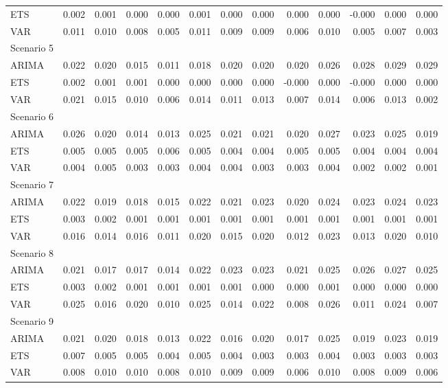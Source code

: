 \begin{table}[!htb]
{\begin{tabular}{lrrrrrrrrrrrr}
      ETS & 0.002 & 0.001 & 0.000 & 0.000 & 0.001 & 0.000 & 0.000 & 0.000 & 0.000 & -0.000 & 0.000 & 0.000 \\
      VAR & 0.011 & 0.010 & 0.008 & 0.005 & 0.011 & 0.009 & 0.009 & 0.006 & 0.010 & 0.005 & 0.007 & 0.003 \\
      \hline
      Scenario 5 & & & & & & & & & & & & \\
      \hline
      ARIMA & 0.022 & 0.020 & 0.015 & 0.011 & 0.018 & 0.020 & 0.020 & 0.020 & 0.026 & 0.028 & 0.029 & 0.029 \\
      ETS & 0.002 & 0.001 & 0.001 & 0.000 & 0.000 & 0.000 & 0.000 & -0.000 & 0.000 & -0.000 & 0.000 & 0.000 \\
      VAR & 0.021 & 0.015 & 0.010 & 0.006 & 0.014 & 0.011 & 0.013 & 0.007 & 0.014 & 0.006 & 0.013 & 0.002 \\
      \hline
      Scenario 6 & & & & & & & & & & & & \\
      \hline
      ARIMA & 0.026 & 0.020 & 0.014 & 0.013 & 0.025 & 0.021 & 0.021 & 0.020 & 0.027 & 0.023 & 0.025 & 0.019 \\
      ETS & 0.005 & 0.005 & 0.005 & 0.006 & 0.005 & 0.004 & 0.004 & 0.005 & 0.005 & 0.004 & 0.004 & 0.004 \\
      VAR & 0.004 & 0.005 & 0.003 & 0.003 & 0.004 & 0.004 & 0.003 & 0.003 & 0.004 & 0.002 & 0.002 & 0.001 \\
      \hline
      Scenario 7 & & & & & & & & & & & & \\
      \hline
      ARIMA & 0.022 & 0.019 & 0.018 & 0.015 & 0.022 & 0.021 & 0.023 & 0.020 & 0.024 & 0.023 & 0.024 & 0.023 \\
      ETS & 0.003 & 0.002 & 0.001 & 0.001 & 0.001 & 0.001 & 0.001 & 0.001 & 0.001 & 0.001 & 0.001 & 0.001 \\
      VAR & 0.016 & 0.014 & 0.016 & 0.011 & 0.020 & 0.015 & 0.020 & 0.012 & 0.023 & 0.013 & 0.020 & 0.010 \\
      \hline
      Scenario 8 & & & & & & & & & & & & \\
      \hline
      ARIMA & 0.021 & 0.017 & 0.017 & 0.014 & 0.022 & 0.023 & 0.023 & 0.021 & 0.025 & 0.026 & 0.027 & 0.025 \\
      ETS & 0.003 & 0.002 & 0.001 & 0.001 & 0.001 & 0.001 & 0.000 & 0.000 & 0.001 & 0.000 & 0.000 & 0.000 \\
      VAR & 0.025 & 0.016 & 0.020 & 0.010 & 0.025 & 0.014 & 0.022 & 0.008 & 0.026 & 0.011 & 0.024 & 0.007 \\
      \hline
      Scenario 9 & & & & & & & & & & & & \\
      \hline
      ARIMA & 0.021 & 0.020 & 0.018 & 0.013 & 0.022 & 0.016 & 0.020 & 0.017 & 0.025 & 0.019 & 0.023 & 0.019 \\
      ETS & 0.007 & 0.005 & 0.005 & 0.004 & 0.005 & 0.004 & 0.003 & 0.003 & 0.004 & 0.003 & 0.003 & 0.003 \\
      VAR & 0.008 & 0.010 & 0.010 & 0.008 & 0.010 & 0.009 & 0.009 & 0.006 & 0.010 & 0.008 & 0.009 & 0.006 \\
      \hline
    \end{tabular}%
  }
  \label{tab:sh_mean}
\end{table}
